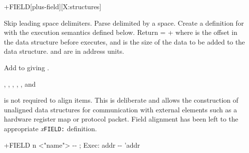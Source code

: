 
\begin{worddef}{}{+FIELD}[plus-field][X:structures]
\item {}

	Skip leading space delimiters.  Parse  delimited
	by a space.  Create a definition for  with the
	execution semantics defined below.  Return  =
	 +  where  is the offset
	in the data structure before  executes, and
	 is the size of the data to be added to the data
	structure.  and  are in address units.

\execute[name]

	Add  to  giving .

\see {},
	,
	,
	,
	,
	 and

	\begin{rationale} %
		 is not required to align items.  This is
		deliberate and allows the construction of unaligned data
		structures for communication with external elements such
		as a hardware register map or protocol packet.
		Field alignment has been left to the appropriate
		\emph{x}\texttt{FIELD:} definition.
	\end{rationale}

	\begin{implement} %

		\word{:} +FIELD\tab{} n <"name"> -{}- ; Exec: addr -{}- 'addr \\
		\tab {}  \word{,} \word{+} \\
		\tab {}  \word{+} \\
		\word{;}
	\end{implement}
\end{worddef}


